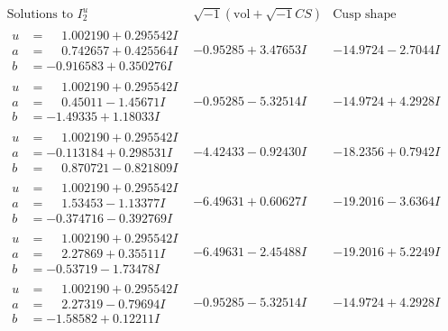 \documentclass[1p]{elsarticle_modified}
\theoremstyle{definition}
\newcommand{\I}{\sqrt{-1}}
\begin{document}
$$\begin{array}{c|c|c}  
\text{Solutions to }I^u_{2}& \I (\text{vol} + \sqrt{-1}CS) & \text{Cusp shape}\\
 \hline 
\begin{aligned}
u &= \phantom{-}1.002190 + 0.295542 I \\
a &= \phantom{-}0.742657 + 0.425564 I \\
b &= -0.916583 + 0.350276 I\end{aligned}
 & -0.95285 + 3.47653 I & -14.9724 - 2.7044 I \\ \hline\begin{aligned}
u &= \phantom{-}1.002190 + 0.295542 I \\
a &= \phantom{-}0.45011 - 1.45671 I \\
b &= -1.49335 + 1.18033 I\end{aligned}
 & -0.95285 - 5.32514 I & -14.9724 + 4.2928 I \\ \hline\begin{aligned}
u &= \phantom{-}1.002190 + 0.295542 I \\
a &= -0.113184 + 0.298531 I \\
b &= \phantom{-}0.870721 - 0.821809 I\end{aligned}
 & -4.42433 - 0.92430 I & -18.2356 + 0.7942 I \\ \hline\begin{aligned}
u &= \phantom{-}1.002190 + 0.295542 I \\
a &= \phantom{-}1.53453 - 1.13377 I \\
b &= -0.374716 - 0.392769 I\end{aligned}
 & -6.49631 + 0.60627 I & -19.2016 - 3.6364 I \\ \hline\begin{aligned}
u &= \phantom{-}1.002190 + 0.295542 I \\
a &= \phantom{-}2.27869 + 0.35511 I \\
b &= -0.53719 - 1.73478 I\end{aligned}
 & -6.49631 - 2.45488 I & -19.2016 + 5.2249 I \\ \hline\begin{aligned}
u &= \phantom{-}1.002190 + 0.295542 I \\
a &= \phantom{-}2.27319 - 0.79694 I \\
b &= -1.58582 + 0.12211 I\end{aligned}
 & -0.95285 - 5.32514 I & -14.9724 + 4.2928 I \\ \hline\begin{aligned}

\end{aligned}
\end{array}$$
\end{document}
